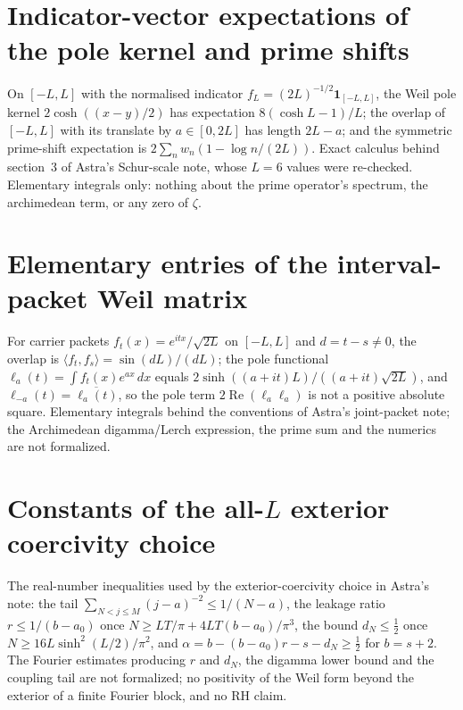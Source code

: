 \documentclass{report}
\theoremstyle{definition}
\begin{document}
\begin{itemize}
\begin{itemize}
\section{Indicator-vector expectations of the pole kernel and prime shifts}
On $[-L,L]$ with the normalised indicator $f_L=(2L)^{-1/2}\mathbf 1_{[-L,L]}$, the Weil pole kernel
$2\cosh((x-y)/2)$ has expectation $8(\cosh L-1)/L$; the overlap of $[-L,L]$ with its translate
by $a\in[0,2L]$ has length $2L-a$; and the symmetric prime-shift expectation is
$2\sum_n w_n(1-\log n/(2L))$. Exact calculus behind section~3 of Astra's Schur-scale note, whose
$L=6$ values were re-checked. Elementary integrals only: nothing about the prime operator's
spectrum, the archimedean term, or any zero of $\zeta$.

\section{Elementary entries of the interval-packet Weil matrix}
For carrier packets $f_t(x)=e^{itx}/\sqrt{2L}$ on $[-L,L]$ and $d=t-s\neq0$, the overlap is
$\langle f_t,f_s\rangle=\sin(dL)/(dL)$; the pole functional
$\ell_a(t)=\int f_t(x)e^{ax}\,dx$ equals $2\sinh((a+it)L)/((a+it)\sqrt{2L})$, and
$\ell_{-a}(t)=\overline{\ell_a(t)}$, so the pole term $2\operatorname{Re}(\ell_a\ell_a)$ is not a
positive absolute square. Elementary integrals behind the conventions of Astra's joint-packet note;
the Archimedean digamma/Lerch expression, the prime sum and the numerics are not formalized.

\section{Constants of the all-$L$ exterior coercivity choice}
The real-number inequalities used by the exterior-coercivity choice in Astra's note: the tail
$\sum_{N<j\le M}(j-a)^{-2}\le 1/(N-a)$, the leakage ratio $r\le 1/(b-a_0)$ once
$N\ge LT/\pi+4LT(b-a_0)/\pi^3$, the bound $d_N\le\tfrac12$ once $N\ge16L\sinh^2(L/2)/\pi^2$, and
$\alpha=b-(b-a_0)r-s-d_N\ge\tfrac12$ for $b=s+2$. The Fourier estimates producing $r$ and $d_N$, the digamma
lower bound and the coupling tail are not formalized; no positivity of the Weil form beyond the
exterior of a finite Fourier block, and no RH claim.


\end{itemize}
\end{itemize}
\end{document}
